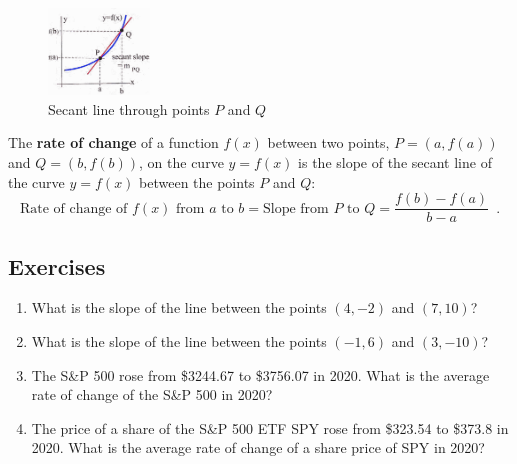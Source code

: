\begin{figure}[ht!]
  \centering
    \includegraphics[width=0.24\textwidth]{img/chap2/image111.png}
\caption{Secant line through points $P$ and $Q$}
\label{fig:2-1-secant}
\end{figure}

\begin{definition}
The {\bf rate of change} of a function $f(x)$ between two points, $P = (a, f(a))$ and $Q = (b, f(b))$, on the curve $y=f(x)$ is the slope of the secant line of the curve $y=f(x)$ between the points $P$ and $Q$:
$$\mbox{Rate of change of } f(x) \mbox{ from } a \mbox{ to } b = \mbox{Slope from } P \mbox{ to } Q = \frac{f(b)-f(a)}{b-a} \enspace .$$
\end{definition}

\subsection{Exercises}

\begin{enumerate}
    \item What is the slope of the line between the points $(4, -2)$ and $(7, 10)$?
    \item What is the slope of the line between the points $(-1, 6)$ and $(3, -10)$?
    \item The S\&P 500 rose from \$3244.67 to \$3756.07 in 2020. What is the average rate of change of the S\&P 500 in 2020?
    \item The price of a share of the S\&P 500 ETF SPY rose from \$323.54 to \$373.8 in 2020. What is the average rate of change of a share price of SPY in 2020?
\end{enumerate}

